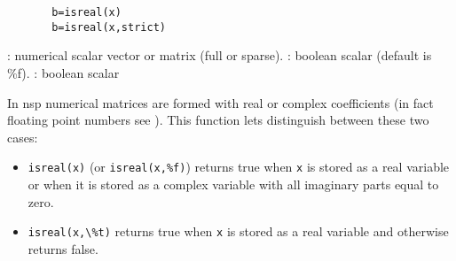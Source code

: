


\begin{mandesc}
\end{mandesc}


\begin{calling_sequence}
    \begin{verbatim}
       b=isreal(x)  
       b=isreal(x,strict)  
    \end{verbatim}
\end{calling_sequence}

\begin{parameters}
  \begin{varlist}
    : numerical scalar vector or matrix (full or sparse).
    : boolean scalar (default is \%f).
    : boolean scalar
  \end{varlist}
\end{parameters}

\begin{mandescription}
In nsp numerical matrices are formed with real or complex coefficients
(in fact floating point numbers see
). This function
lets distinguish between these two cases:
\begin{itemize}
\item \verb!isreal(x)! (or \verb!isreal(x,%f)!) returns true when 
\verb!x! is stored as a real variable or when it is stored 
as a complex variable with all imaginary parts equal to zero. 
\item \verb!isreal(x,\%t)! returns true when \verb!x! is stored as a real
variable and otherwise returns false.
\end{itemize}

\end{mandescription}

\begin{examples}

\begin{program}
\end{program}

\end{examples}

